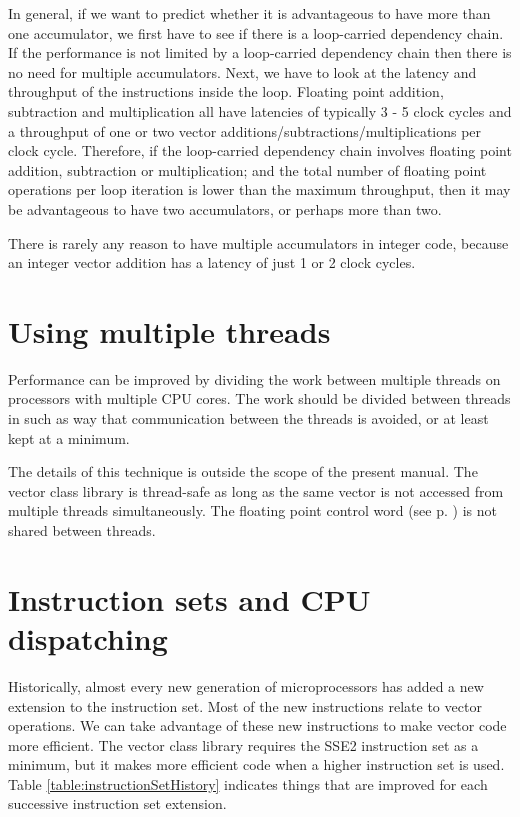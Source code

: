 \documentclass[vcl_manual.tex]{subfiles}
\begin{document}
In general, if we want to predict whether it is advantageous to have more than one accumulator, we first have to see if there is a loop-carried dependency chain. If the performance is not limited by a loop-carried dependency chain then there is no need for multiple accumulators. Next, we have to look at the latency and throughput of the instructions inside the loop. Floating point addition, subtraction and multiplication all have latencies of typically 3 - 5 clock cycles and a throughput of one or two vector additions/subtractions/multiplications per clock cycle. Therefore, if the loop-carried dependency chain involves floating point addition, subtraction or multiplication; and the total number of floating point operations per loop iteration is lower than the maximum throughput, then it may be advantageous to have two accumulators, or perhaps more than two.

There is rarely any reason to have multiple accumulators in integer code, because an integer vector addition has a latency of just 1 or 2 clock cycles.

\section{Using multiple threads}\label{UsingMultipleThreads}

Performance can be improved by dividing the work between multiple threads on processors with multiple CPU cores. The work should be divided between threads in such as way that communication between the threads is avoided, or at least kept at a minimum.

The details of this technique is outside the scope of the present manual. The vector class library is thread-safe as long as the same vector is not accessed from multiple threads simultaneously. The floating point control word (see p. \pageref{FPControlWordManipulationFunctions}) is not shared between threads.


\section{Instruction sets and CPU dispatching}\label{CPUDispatching}
\flushleft

Historically, almost every new generation of microprocessors has added a new extension to the instruction set. Most of the new instructions relate to vector operations. We can take advantage of these new instructions to make vector code more efficient. The vector class library requires the SSE2 instruction set as a minimum, but it makes more efficient code when a higher instruction set is used. Table \ref{table:instructionSetHistory} indicates things that are improved for each successive instruction set extension.
\end{document}
